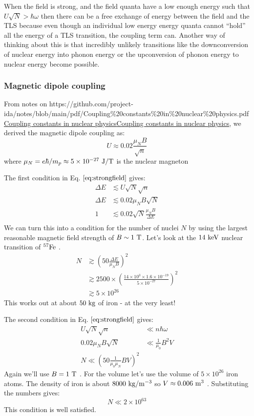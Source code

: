 \documentclass[
]{article}
\let\oldhref\href
\renewcommand{\href}[2]{\ifx#1\urlprefix\oldhref{#1}{#2}\else\uline{\oldhref{#1}{#2}}\fi}
\renewcommand{\[}{\begin{equation}}
\renewcommand{\]}{\end{equation}}
\begin{document}
When the field is strong, and the field quanta have a low enough energy
such that \(U\sqrt{N}>\hbar\omega\) then there can be a free exchange of
energy between the field and the TLS because even though an individual
low energy energy quanta cannot ``hold'' all the energy of a TLS
transition, the coupling term can. Another way of thinking about this is
that incredibly unlikely transitions like the downconversion of nuclear
energy into phonon energy or the upconversion of phonon energy to
nuclear energy become possible.

\subsubsection{Magnetic dipole coupling}\label{magnetic-dipole-coupling}

From notes on
\href{https://github.com/project-ida/notes/blob/main/pdf/Coupling\%20constants\%20in\%20nuclear\%20physics.pdf}{Coupling
constants in nuclear physics}, we derived the magnetic dipole coupling
as: \[
U \approx 0.02 \frac{{\mu_N}B}{\sqrt{n}}
\] where \(\mu_N = e\hbar/m_p \approx 5\times 10^{-27} \ \rm J/T\) is
the nuclear magneton

The first condition in Eq. \(\ref{eq:strongfield}\) gives: \[
\begin{aligned}
\Delta E &\lesssim U\sqrt{N}\sqrt{n} \\
{\Delta E} &\lesssim  0.02 \mu_N B \sqrt{N} \\
1 &\lesssim 0.02\sqrt{N}\frac{\mu_N B}{\Delta E} \\
\end{aligned}
\] We can turn this into a condition for the number of nuclei \(N\) by
using the largest reasonable magnetic field strength of
\(B\sim 1 \ \rm T\). Let's look at the \(\rm 14 \ keV\) nuclear
transition of \(\rm ^{57}Fe\) . \[
\begin{aligned}
N &\gtrsim \left(50\frac{\Delta E}{\mu_N B}\right)^2 \\
&\gtrsim 2500 \times \left(\frac{14 \times 10^3 \times 1.6\times 10^{-19}}{5\times 10^{-27}}\right)^2
\\
&\gtrsim 5 \times 10^{26}
\end{aligned}
\] This works out at about \(50 \ \rm kg\) of iron - at the very least!

The second condition in Eq. \(\ref{eq:strongfield}\) gives: \[
\begin{aligned}
U\sqrt{N}\sqrt{n} &\ll  n\hbar \omega \\
0.02 \mu_N B \sqrt{N} &\ll \frac{1}{\mu_0} B^2 V  \\
N \ll \left(50\frac{1}{\mu_0\mu_N}BV\right)^2
\end{aligned}
\] Again we'll use \(B=1 \ \rm T\) . For the volume let's use the volume
of \(5 \times 10^{26}\) iron atoms. The density of iron is about
\(8000 \ \rm kg/m^{-3}\) so \(V \approx 0.006 \ \rm m^3\) . Substituting
the numbers gives: \[
N \ll 2\times 10^{63}
\] This condition is well satisfied.
\end{document}
